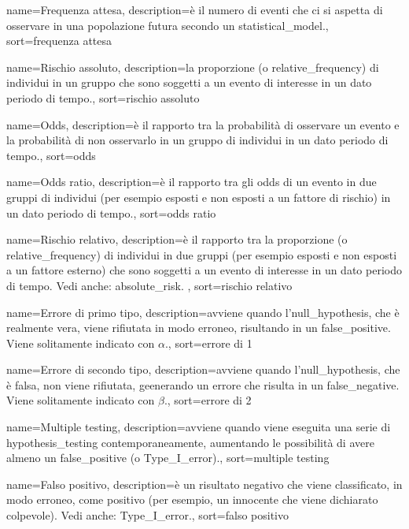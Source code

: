 {
	 name={Frequenza attesa},
	 description={\`e il numero di eventi che ci si aspetta di osservare in una popolazione futura secondo un \gls{statistical_model}.},
	 sort={frequenza attesa}
}

{
	 name={Rischio assoluto},
	 description={la proporzione (o \gls{relative_frequency}) di individui in un gruppo che sono soggetti a un evento di interesse in un dato periodo di tempo.},
	 sort={rischio assoluto}
}

{
	 name={Odds},
	 description={\`e il rapporto tra la probabilit\`a di osservare un evento e la probabilit\`a di non osservarlo in un gruppo di individui in un dato periodo di tempo.},
	 sort={odds}
}

{
	 name={Odds ratio},
	 description={\`e il rapporto tra gli \gls{odds} di un evento in due gruppi di individui (per esempio esposti e non esposti a un fattore di rischio) in un dato periodo di tempo.},
	 sort={odds ratio}
}

{
	 name={Rischio relativo},
	 description={\`e il rapporto tra la proporzione (o \gls{relative_frequency}) di individui in due gruppi (per esempio esposti e non esposti a un fattore esterno)  che sono soggetti a un evento di interesse in un dato periodo di tempo. Vedi anche: \gls{absolute_risk}. },
	 sort={rischio relativo}
}

{
	 name={Errore di primo tipo},
	 description={avviene quando l'\gls{null_hypothesis}, che \`e realmente vera, viene rifiutata in modo erroneo, risultando in un \gls{false_positive}. Viene solitamente indicato con $\alpha$.},
	 sort={errore di 1}
}

{
	 name={Errore di secondo tipo},
	 description={avviene quando l'\gls{null_hypothesis}, che \`e falsa,  non viene rifiutata, geenerando un errore che risulta in un \gls{false_negative}. Viene solitamente indicato con $\beta$.},
	 sort={errore di 2}
}

{
	 name={Multiple testing},
	 description={avviene quando viene eseguita una serie di \gls{hypothesis_testing} contemporaneamente, aumentando le possibilit\`a di avere almeno un \gls{false_positive} (o \gls{Type_I_error}).},
	 sort={multiple testing}
}

{
	 name={Falso positivo},
	 description={\`e un risultato negativo che viene classificato, in modo erroneo, come positivo (per esempio, un innocente che viene dichiarato colpevole). Vedi anche: \gls{Type_I_error}.},
	 sort={falso positivo}
}


